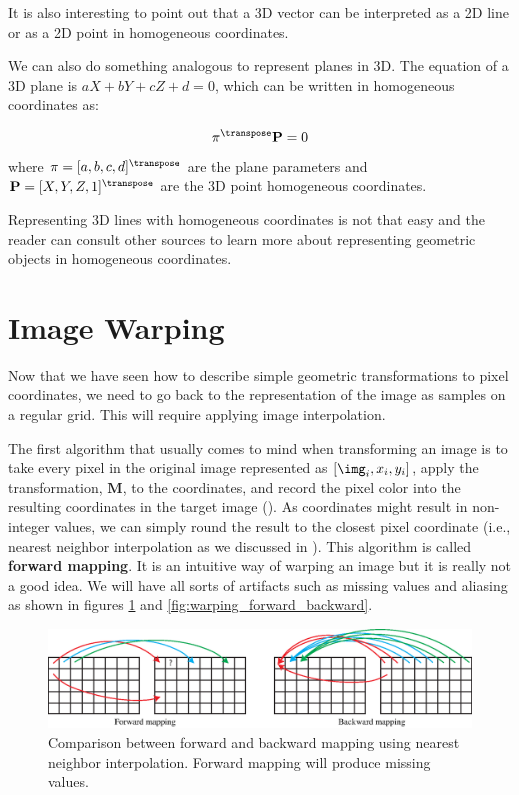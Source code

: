 It is also interesting to point out that a 3D vector can be interpreted as a 2D line or as a 2D point in homogeneous coordinates. 

We can also do something analogous to represent planes in 3D. The equation of a 3D plane is $aX+bY+cZ+d=0$, which can be written in homogeneous coordinates as:

\begin{equation}
    \mathbf{\pi}^\transpose   \mathbf{P} = 0
\end{equation}
where $\mathbf{\pi} = [a,b,c,d]^\transpose$ are the plane parameters and $\mathbf{P}=[X,Y,Z,1]^\transpose$ are the 3D point homogeneous coordinates. 





Representing 3D lines with homogeneous coordinates is not that easy and the reader can consult other sources \cite{Hartley2004} to learn more about representing geometric objects in homogeneous coordinates.

\section{Image Warping}
\label{sect:image_warping}

Now that we have seen how to describe simple geometric transformations to  pixel coordinates, we need to go back to the representation of the image as samples on a regular grid. This will require applying image interpolation.

The first algorithm that usually comes to mind when transforming an image is to take every pixel in the original image represented as $[\img_i,x_i,y_i]$, apply the transformation, $\mathbf{M}$, to the coordinates, and record the pixel color into the resulting coordinates in the target image (\fig{\ref{fig:warping_sketch}}). As coordinates might result in non-integer values, we can simply round the result to the closest pixel coordinate (i.e., nearest neighbor interpolation as we discussed in \sect{\ref{sec:interpolation}}). This algorithm is called {\bf forward mapping}.
It is an intuitive way of warping an image but it is really not a good idea. We will have all sorts of artifacts such as missing values and aliasing as shown in figures \ref{fig:warping_sketch} and \ref{fig:warping_forward_backward}.


\begin{figure}[t]
\centerline{
\includegraphics[width=1\linewidth]{figures/imaging_geometry/warping_sketch.eps}
}
\caption{Comparison between forward and backward mapping using nearest neighbor interpolation. Forward mapping will produce missing values.}
\label{fig:warping_sketch}
\end{figure}


